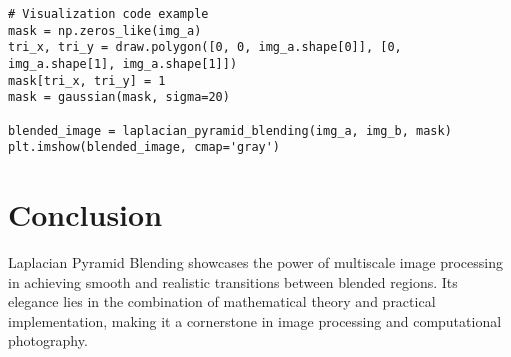 \begin{verbatim}
# Visualization code example
mask = np.zeros_like(img_a)
tri_x, tri_y = draw.polygon([0, 0, img_a.shape[0]], [0, img_a.shape[1], img_a.shape[1]])
mask[tri_x, tri_y] = 1
mask = gaussian(mask, sigma=20)

blended_image = laplacian_pyramid_blending(img_a, img_b, mask)
plt.imshow(blended_image, cmap='gray')
\end{verbatim}

\section*{Conclusion}
Laplacian Pyramid Blending showcases the power of multiscale image processing in achieving smooth and realistic transitions between blended regions. Its elegance lies in the combination of mathematical theory and practical implementation, making it a cornerstone in image processing and computational photography.
